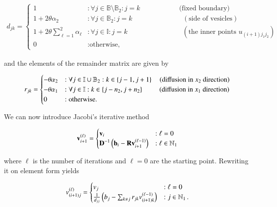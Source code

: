 \documentclass[11pt,english,a4paper]{article}
\begin{document}
\begin{flushleft}
\begin{align}
d_{jk} = \begin{cases} 
1 &:\forall j\in\mathbb{B}\setminus\mathbb{B}_2  : j=k \,\,\,\,\quad\qquad\qquad \text{(fixed boundary)}\\
1+ 2\theta \alpha_2 &: \forall j\in\mathbb{B}_2: j=k \,\,\quad\qquad\qquad\qquad (\text{side of vesicles}) \\ 
1+ 2\theta \sum_{\ell = 1}^2 \alpha_\ell &: \forall j\in\mathbb{I}: j=k \qquad\qquad\qquad\qquad (\text{the inner points }u_{(i+1)j_1j_2}) \\ 
 0 & : \text{otherwise,} \end{cases}
\label{eq_24}
\end{align}

and the elements of the remainder matrix are given by

\begin{align}
r_{jk} = \begin{cases} 
-\theta \alpha_2 &: \forall j\in\mathbb{I}\cup\mathbb{B}_2: k\in\left\lbrace{j-1,j+1}\right\rbrace\quad \text{(diffusion in $x_2$ direction)} \\ 
- \theta \alpha_1 &: \forall j\in\mathbb{I} : k \in \left\lbrace{j-n_2,j+n_2}\right\rbrace \,\,\qquad\text{(diffusion in $x_1$ direction)} \\
 0 & : \text{otherwise.} \end{cases}
\label{eq_25}
\end{align}

We can now introduce Jacobi's iterative method

\begin{align*}
\textbf{v}_{i+1}^{(\ell)} = \begin{cases}
\textbf{v}_i &: \ell=0 \\
\textbf{D}^{-1}\left({\textbf{b}_i-\textbf{R}\textbf{v}_{i+1}^{(\ell-1)}}\right) &: \ell\in\mathbb{N}_1
\end{cases}
\end{align*}

where $\ell$ is the number of iterations and $\ell=0$ are the starting point. Rewriting it on element form yields

\begin{align*}
v_{(i+1)j}^{(\ell)} = \begin{cases} v_j &: \ell = 0 \\ \frac{1}{d_{jj}}\left({b_j - \sum_{k\neq j} r_{jk} v_{(i+1)k}^{(\ell-1)}}\right) &: j\in\mathbb{N}_1 \,.\end{cases}
\end{align*}


\end{flushleft}
\end{document}
